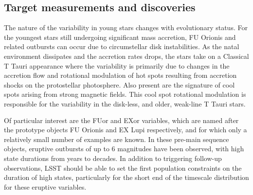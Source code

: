 

\subsection{Target measurements and discoveries}
\label{sec:\secname:targets}

The nature of the variability in young stars changes with evolutionary
status. For the youngest stars still undergoing significant mass
accretion, FU Orionis and related outbursts can occur due to
circumstellar disk instabilities. As the natal environment dissipates
and the accretion rates drops, the stars take on a Classical T Tauri
appearance where the variability is primarily due to changes in the
accretion flow and rotational modulation of hot spots resulting from
accretion shocks on the protostellar photosphere. Also present are the
signature of cool spots arising from strong magnetic fields. This cool
spot rotational modulation is responsible for the variability in the
disk-less, and older, weak-line T Tauri stars.

Of particular interest are the FUor and EXor variables, which are
  named after the prototype objects FU Orionis \citep{hartmann96}
  and EX Lupi \citep{herbig01} respectively, and for which
  only a relatively small number of examples are known. In these
  pre-main sequence objects, eruptive outbursts of up to 6 magnitudes
  have been observed, with high state durations from years to
  decades. In addition to triggering follow-up observations, LSST
  should be able to set the first population constraints on the
  duration of high states, particularly for the short end of the
  timescale distribution for these eruptive variables.







